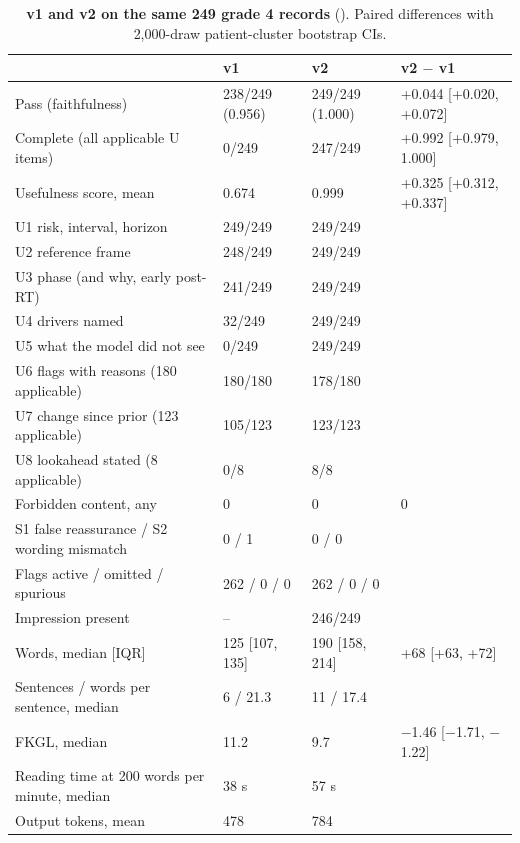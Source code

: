 \documentclass[11pt,a4paper]{article}
\begin{document}
\begin{table}[H]
\centering
\footnotesize
\renewcommand{\thetable}{S39}\renewcommand{\theHtable}{S39}
\caption{\textbf{v1 and v2 on the same 249 grade 4 records} (). Paired differences with
2,000-draw patient-cluster bootstrap CIs.}
\label{tab:S39}
\begin{tabularx}{\linewidth}{@{}L R{2.3cm} R{2.3cm} R{3.0cm}@{}}
\toprule
 & v1 & v2 & v2 $-$ v1 \\
\midrule
Pass (faithfulness) & 238/249 (0.956) & 249/249 (1.000) & +0.044 [+0.020, +0.072] \\
Complete (all applicable U items) & 0/249 & 247/249 & +0.992 [+0.979, 1.000] \\
Usefulness score, mean & 0.674 & 0.999 & +0.325 [+0.312, +0.337] \\
U1 risk, interval, horizon & 249/249 & 249/249 & \\
U2 reference frame & 248/249 & 249/249 & \\
U3 phase (and why, early post-RT) & 241/249 & 249/249 & \\
U4 drivers named & 32/249 & 249/249 & \\
U5 what the model did not see & 0/249 & 249/249 & \\
U6 flags with reasons (180 applicable) & 180/180 & 178/180 & \\
U7 change since prior (123 applicable) & 105/123 & 123/123 & \\
U8 lookahead stated (8 applicable) & 0/8 & 8/8 & \\
Forbidden content, any & 0 & 0 & 0 \\
S1 false reassurance / S2 wording mismatch & 0 / 1 & 0 / 0 & \\
Flags active / omitted / spurious & 262 / 0 / 0 & 262 / 0 / 0 & \\
Impression present & -- & 246/249 & \\
Words, median [IQR] & 125 [107, 135] & 190 [158, 214] & +68 [+63, +72] \\
Sentences / words per sentence, median & 6 / 21.3 & 11 / 17.4 & \\
FKGL, median & 11.2 & 9.7 & $-$1.46 [$-$1.71, $-$1.22] \\
Reading time at 200 words per minute, median & 38 s & 57 s & \\
Output tokens, mean & 478 & 784 & \\
\bottomrule
\end{tabularx}
\end{table}
\end{document}
